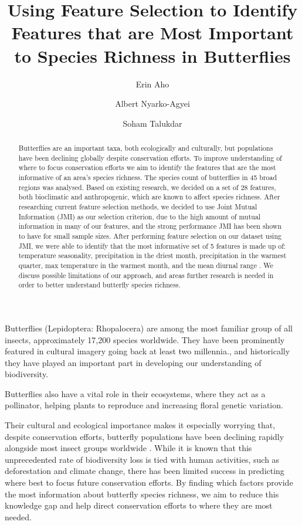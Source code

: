 \documentclass[prl,showpacs,superscriptaddress,twocolumn,longbibliography]{revtex4-1}
\begin{document}
\author{Erin Aho}
\author{Albert Nyarko-Agyei}
\author{Soham Talukdar}

\title{Using Feature Selection to Identify Features that are Most Important to Species Richness in Butterflies}

\begin{abstract}
Butterflies are an important taxa, both ecologically and culturally, but populations have been declining globally despite conservation efforts. To improve understanding of where to focus conservation efforts we aim to identify the features that are the most informative of an area's species richness.
The species count of butterflies in 45 broad regions was analysed. Based on existing research, we decided on a set of 28 features, both bioclimatic and anthropogenic, which are known to affect species richness. After researching current feature selection methods, we decided to use Joint Mutual Information (JMI) as our selection criterion, due to the high amount of mutual information in many of our features, and the strong performance JMI has been shown to have for small sample sizes. After performing feature selection on our dataset using JMI, we were able to identify that the most informative set of 5 features is made up of: temperature seasonality, precipitation in the driest month, precipitation in the warmest quarter, max temperature in the warmest month, and the mean diurnal range . We discuss possible limitations of our approach, and areas further research is needed in order to better understand butterfly species richness.
\end{abstract}

\maketitle

Butterflies (Lepidoptera: Rhopalocera) are among the most familiar group of all insects, approximately 17,200 species worldwide\cite{shields_world_1989}. They have been prominently featured in cultural imagery going back at least two millennia.\cite{Dicke2000}, and historically they have played an important part in developing our understanding of biodiversity\cite{levin_butterflies_2001}. 

Butterflies also have a vital role in their ecosystems, where they act as a pollinator, helping plants to reproduce and increasing floral genetic variation\cite{ghazanfar_butterflies_2016}.

Their cultural and ecological importance makes it especially worrying that, despite conservation efforts, butterfly populations have been declining rapidly alongside most insect groups worldwide \cite{Wagner2021}. While it is known that this unprecedented rate of biodiversity loss is tied with human activities, such as deforestation and climate change\cite{white_human_2007, montgomery_is_2020, clark_effects_2007}, there has been limited success in predicting where best to focus future conservation efforts. By finding which factors provide the most information about butterfly species richness, we aim to reduce this knowledge gap and help direct conservation efforts to where they are most needed.
\end{document}
